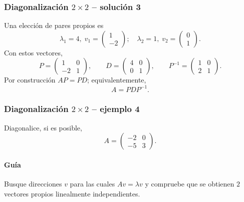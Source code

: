 \subsubsection*{Diagonalización $2\times 2$ -- solución 3}
\scriptsize
Una elección de pares propios es
\[
\lambda_1=4,\;v_1=\begin{pmatrix}1\\-2\end{pmatrix};\quad \lambda_2=1,\;v_2=\begin{pmatrix}0\\1\end{pmatrix}.
\]
Con estos vectores,
\[
P=\begin{pmatrix}1 & 0\\-2 & 1\end{pmatrix},\qquad D=\begin{pmatrix}4 & 0\\0 & 1\end{pmatrix},\qquad P^{-1}=\begin{pmatrix}1 & 0\\2 & 1\end{pmatrix}.
\]
Por construcción $AP=PD$; equivalentemente,
\[
\boxed{A=PDP^{-1}}.
\]


\subsubsection*{Diagonalización $2\times 2$ -- ejemplo 4}

Diagonalice, si es posible,
\[
A=\begin{pmatrix}-2 & 0\\-5 & 3\end{pmatrix}.
\]

\paragraph{Guía}
Busque direcciones $v$ para las cuales $Av=\lambda v$ y compruebe que se obtienen $2$ vectores propios linealmente independientes.



